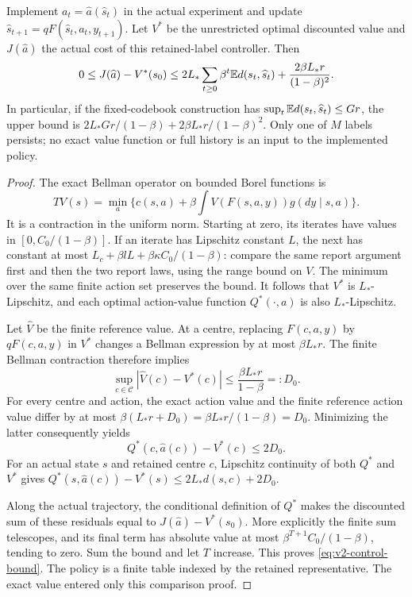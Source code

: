 \begin{theorem}
\label{thm:v2-control}
Implement $a_t=\widehat a(\widehat s_t)$ in the actual experiment and
update $\widehat s_{t+1}=qF(\widehat s_t,a_t,y_{t+1})$. Let $V^*$ be
the unrestricted optimal discounted value and $J(\widehat a)$ the actual
cost of this retained-label controller. Then
\begin{equation}\label{eq:v2-control-bound}
 0\le J(\widehat a)-V^*(s_0)
 \le2L_*\sum_{t\ge0}\beta^t\mathbb E d(s_t,\widehat s_t)
           +\frac{2\beta L_*r}{(1-\beta)^2}.
\end{equation}
In particular, if the fixed-codebook construction has
$\sup_t\mathbb E d(s_t,\widehat s_t)\le Gr$, the upper bound is
$2L_*Gr/(1-\beta)+2\beta L_*r/(1-\beta)^2$.
Only one of $M$ labels persists; no exact value function or full history
is an input to the implemented policy.
\end{theorem}
\begin{proof}
The exact Bellman operator on bounded Borel functions is
\[
 TV(s)=\min_a\{c(s,a)+\beta\int V(F(s,a,y))g(dy\mid s,a)\}.
\]
It is a contraction in the uniform norm. Starting at zero, its iterates
have values in $[0,C_0/(1-\beta)]$. If an iterate has Lipschitz constant
$L$, the next has constant at most
$L_c+\beta lL+\beta\kappa C_0/(1-\beta)$: compare the same report
argument first and then the two report laws, using the range bound on
$V$. The minimum over the same finite action set preserves the bound.
It follows that $V^*$ is $L_*$-Lipschitz, and each optimal action-value
function $Q^*(\cdot,a)$ is also $L_*$-Lipschitz.

Let $\widehat V$ be the finite reference value. At a centre, replacing
$F(c,a,y)$ by $qF(c,a,y)$ in $V^*$ changes a Bellman expression by at
most $\beta L_*r$. The finite Bellman contraction therefore implies
\[
 \sup_{c\in\mathcal C}|\widehat V(c)-V^*(c)|
 \le\frac{\beta L_*r}{1-\beta}=:D_0.
\]
For every centre and action, the exact action value and the finite
reference action value differ by at most
$\beta(L_*r+D_0)=\beta L_*r/(1-\beta)=D_0$.
Minimizing the latter consequently yields
\[
 Q^*(c,\widehat a(c))-V^*(c)\le2D_0.
\]
For an actual state $s$ and retained centre $c$, Lipschitz continuity of
both $Q^*$ and $V^*$ gives
$Q^*(s,\widehat a(c))-V^*(s)\le2L_*d(s,c)+2D_0$.

Along the actual trajectory, the conditional definition of $Q^*$ makes
the discounted sum of these residuals equal to
$J(\widehat a)-V^*(s_0)$. More explicitly the finite sum telescopes,
and its final term has absolute value at most
$\beta^{T+1}C_0/(1-\beta)$, tending to zero. Sum the bound and let
$T$ increase. This proves \eqref{eq:v2-control-bound}.
The policy is a finite table indexed by the retained representative.
The exact value entered only this comparison proof.
\end{proof}

